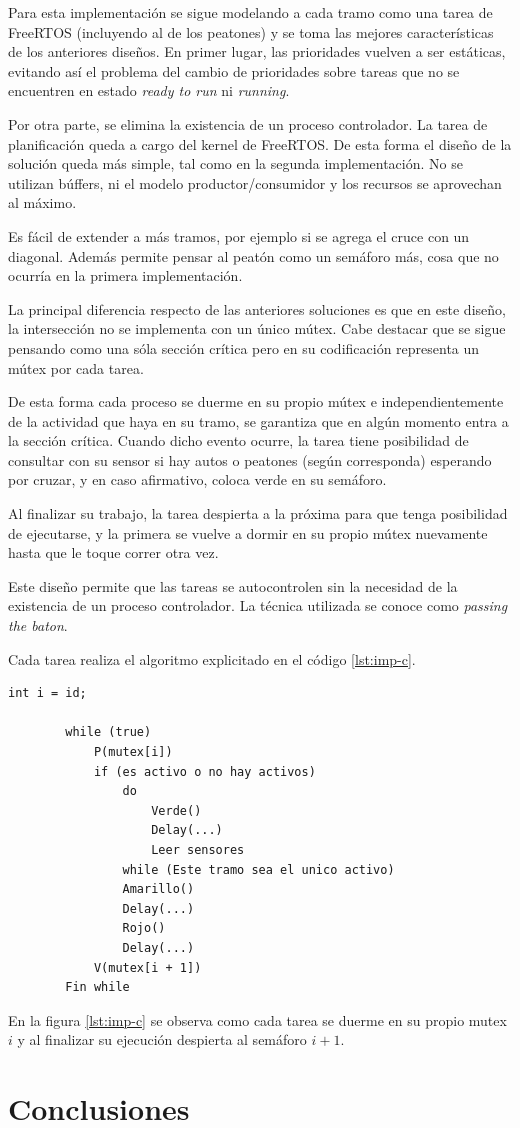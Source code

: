 	Para esta implementación se sigue modelando a cada tramo como una tarea de FreeRTOS (incluyendo al de los peatones) y se toma las mejores características de los anteriores diseños.
	En primer lugar, las prioridades vuelven a ser estáticas, evitando así el problema del cambio de prioridades sobre tareas que no se encuentren en estado \emph{ready to run} ni \emph{running}.

	Por otra parte, se elimina la existencia de un proceso controlador.
	La tarea de planificación queda a cargo del kernel de FreeRTOS.
	De esta forma el diseño de la solución queda más simple, tal como en la segunda implementación.
	No se utilizan búffers, ni el modelo productor/consumidor y los recursos se aprovechan al máximo.

	Es fácil de extender a más tramos, por ejemplo si se agrega el cruce con un diagonal.
	Además permite pensar al peatón como un semáforo más, cosa que no ocurría en la primera implementación.

	La principal diferencia respecto de las anteriores soluciones es que en este diseño, la intersección no se implementa con un único mútex.
	Cabe destacar que se sigue pensando como una sóla sección crítica pero en su codificación representa un mútex por cada tarea.

	De esta forma cada proceso se duerme en su propio mútex e independientemente de la actividad que haya en su tramo, se garantiza que en algún momento entra a la sección crítica.
	Cuando dicho evento ocurre, la tarea tiene posibilidad de consultar con su sensor si hay autos o peatones (según corresponda) esperando por cruzar, y en caso afirmativo, coloca verde en su semáforo.

	Al finalizar su trabajo, la tarea despierta a la próxima para que tenga posibilidad de ejecutarse, y la primera se vuelve a dormir en su propio mútex nuevamente hasta que le toque correr otra vez.

	Este diseño permite que las tareas se autocontrolen sin la necesidad de la existencia de un proceso controlador.
	La técnica utilizada se conoce como \emph{passing the baton}.

	Cada tarea realiza el algoritmo explicitado en el código \ref{lst:imp-c}.

	\begin{lstlisting}[float, label=lst:imp-c, caption=Pseudocódigo del programa que corre cada tarea en la implementación C.]
		int i = id;

		while (true)
			P(mutex[i])
			if (es activo o no hay activos)
				do
					Verde()
					Delay(...)
					Leer sensores
				while (Este tramo sea el unico activo)
				Amarillo()
				Delay(...)
				Rojo()
				Delay(...)
			V(mutex[i + 1])
		Fin while
	\end{lstlisting}

	En la figura \ref{lst:imp-c} se observa como cada tarea se duerme en su propio mutex $i$ y al finalizar su ejecución despierta al semáforo $i+1$.



\section{Conclusiones}\label{sec:conclusiones}

